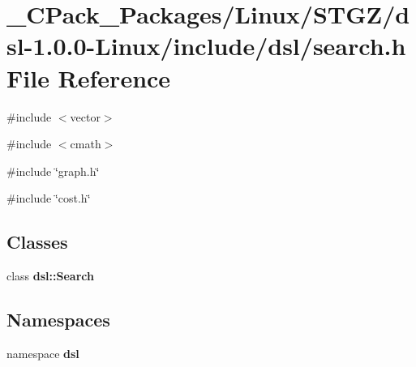 \section{\_\-CPack\_\-Packages/Linux/STGZ/dsl-\/1.0.0-\/Linux/include/dsl/search.h File Reference}
\label{__CPack__Packages_2Linux_2STGZ_2dsl-1_80_80-Linux_2include_2dsl_2search_8h}
{\ttfamily \#include $<$vector$>$}\par
{\ttfamily \#include $<$cmath$>$}\par
{\ttfamily \#include \char`\"{}graph.h\char`\"{}}\par
{\ttfamily \#include \char`\"{}cost.h\char`\"{}}\par
\subsection*{Classes}
\begin{DoxyCompactItemize}
\item 
class {\bf dsl::Search}
\end{DoxyCompactItemize}
\subsection*{Namespaces}
\begin{DoxyCompactItemize}
\item 
namespace {\bf dsl}
\end{DoxyCompactItemize}
